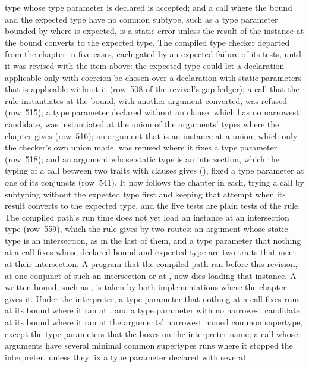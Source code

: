 \begin{description}
type whose type parameter is declared  is
accepted; and a call where the bound and the expected type have no common
subtype, such as a type parameter bounded by  where \TYP{()} is
expected, is a static error unless the result of the instance at the bound
converts to the expected type.
The compiled type checker departed from the chapter in five cases, each gated
by an expected failure of its tests, until it was revised with the item above:
the expected type could let a declaration applicable only with coercion be
chosen over a declaration with static parameters that is applicable without it
(row~508 of the revival's gap ledger); a call that the rule instantiates at the
bound, with another argument converted, was refused (row~515); a type parameter
declared without an  clause, which has no narrowest candidate, was
instantiated at the union of the arguments' types where the chapter gives
 (row~516); an argument that is an instance at a union, which only the
checker's own union made, was refused where it fixes a type parameter
(row~518); and an argument whose static type is an intersection, which the
typing of a call between two traits with  clauses gives
(), fixed a type parameter at one of its conjuncts
(row~541).
It now follows the chapter in each, trying a call by subtyping without the
expected type first and keeping that attempt when its result converts to the
expected type, and the five tests are plain tests of the rule.
The compiled path's run time does not yet load an instance at an intersection
type (row~559), which the rule gives by two routes: an argument whose static
type is an intersection, as in the last of them, and a type parameter that
nothing at a call fixes whose declared bound and expected type are two traits
that meet at their intersection.
A program that the compiled path ran before this revision, at one conjunct of
such an intersection or at , now dies loading that instance.
A written bound, such as , is taken by both implementations where
the chapter gives it.
Under the interpreter, a type parameter that nothing at a call fixes runs at its
bound where it ran at , and a type parameter with no narrowest
candidate at its bound where it ran at the arguments' narrowest named common
supertype, except the type parameters that the boxes on the interpreter name;
a call whose arguments have several minimal common supertypes runs where it
stopped the interpreter, unless they fix a type parameter declared with several

\end{description}
